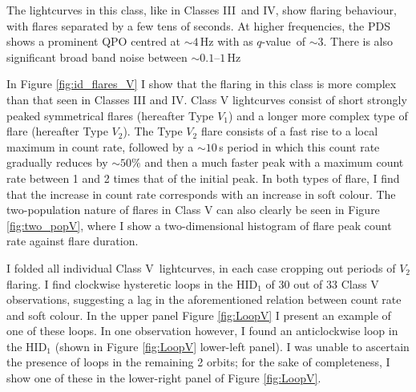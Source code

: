 \par The lightcurves in this class\indexv, like in Classes III\indexiii\ and IV\indexiv, show flaring behaviour, with flares separated by a few tens of seconds.  At higher frequencies, the PDS shows a prominent QPO centred at $\sim4$\,Hz with as $q$-value\indexq\ of $\sim3$.  There is also significant broad band noise between $\sim0.1$--$1$\,Hz
\par In Figure \ref{fig:id_flares_V} I show that the flaring in this class is more complex than that seen in Classes III and IV.  Class V lightcurves consist of short strongly peaked symmetrical flares (hereafter Type $V_1$) and a longer more complex type of flare (hereafter Type $V_2$).  The Type $V_2$ flare consists of a fast rise to a local maximum in count rate, followed by a $\sim10$\,s period in which this count rate gradually reduces by $\sim50\%$ and then a much faster peak with a maximum count rate between 1 and 2 times that of the initial peak.  In both types of flare, I find that the increase in count rate corresponds with an increase in soft colour.  The two-population nature of flares in Class V can also clearly be seen in Figure \ref{fig:two_popV}, where I show a two-dimensional histogram of flare peak count rate against flare duration.
\par I folded all individual Class V\indexv\ lightcurves, in each case cropping out periods of $V_2$ flaring.  I find clockwise hysteretic loops in the HID$_1$ of 30 out of 33 Class V observations, suggesting a lag in the aforementioned relation between count rate and soft colour.  In the upper panel Figure \ref{fig:LoopV} I present an example of one of these loops.  In one observation however, I found an anticlockwise loop in the HID$_1$ (shown in Figure \ref{fig:LoopV} lower-left panel).  I was unable to ascertain the presence of loops in the remaining 2 orbits; for the sake of completeness, I show one of these in the lower-right panel of Figure \ref{fig:LoopV}.

